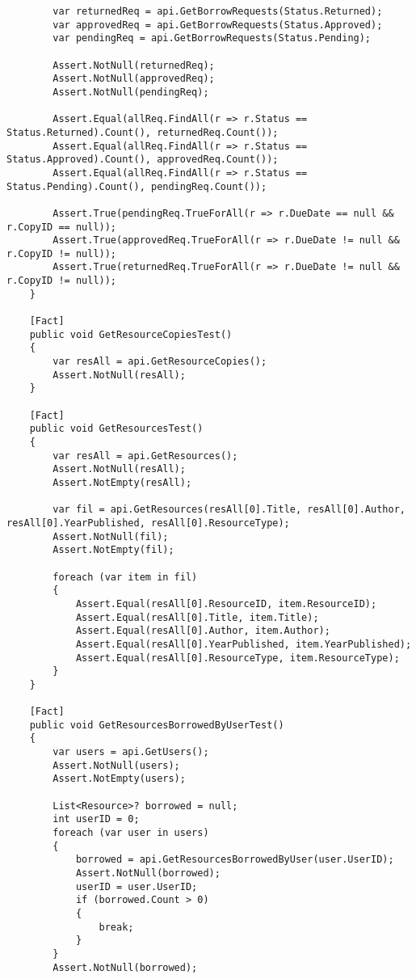 \begin{verbatim}
        var returnedReq = api.GetBorrowRequests(Status.Returned);
        var approvedReq = api.GetBorrowRequests(Status.Approved);
        var pendingReq = api.GetBorrowRequests(Status.Pending);

        Assert.NotNull(returnedReq);
        Assert.NotNull(approvedReq);
        Assert.NotNull(pendingReq);

        Assert.Equal(allReq.FindAll(r => r.Status == Status.Returned).Count(), returnedReq.Count());
        Assert.Equal(allReq.FindAll(r => r.Status == Status.Approved).Count(), approvedReq.Count());
        Assert.Equal(allReq.FindAll(r => r.Status == Status.Pending).Count(), pendingReq.Count());

        Assert.True(pendingReq.TrueForAll(r => r.DueDate == null && r.CopyID == null));
        Assert.True(approvedReq.TrueForAll(r => r.DueDate != null && r.CopyID != null));
        Assert.True(returnedReq.TrueForAll(r => r.DueDate != null && r.CopyID != null));
    }

    [Fact]
    public void GetResourceCopiesTest()
    {
        var resAll = api.GetResourceCopies();
        Assert.NotNull(resAll);
    }

    [Fact]
    public void GetResourcesTest()
    {
        var resAll = api.GetResources();
        Assert.NotNull(resAll);
        Assert.NotEmpty(resAll);

        var fil = api.GetResources(resAll[0].Title, resAll[0].Author, resAll[0].YearPublished, resAll[0].ResourceType);
        Assert.NotNull(fil);
        Assert.NotEmpty(fil);

        foreach (var item in fil)
        {
            Assert.Equal(resAll[0].ResourceID, item.ResourceID);
            Assert.Equal(resAll[0].Title, item.Title);
            Assert.Equal(resAll[0].Author, item.Author);
            Assert.Equal(resAll[0].YearPublished, item.YearPublished);
            Assert.Equal(resAll[0].ResourceType, item.ResourceType);
        }
    }

    [Fact]
    public void GetResourcesBorrowedByUserTest()
    {
        var users = api.GetUsers();
        Assert.NotNull(users);
        Assert.NotEmpty(users);

        List<Resource>? borrowed = null;
        int userID = 0;
        foreach (var user in users)
        {
            borrowed = api.GetResourcesBorrowedByUser(user.UserID);
            Assert.NotNull(borrowed);
            userID = user.UserID;
            if (borrowed.Count > 0)
            {
                break;
            }
        }
        Assert.NotNull(borrowed);


\end{verbatim}

